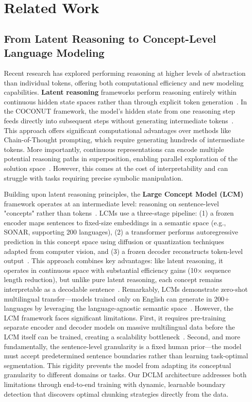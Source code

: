 \section{Related Work}
\subsection{From Latent Reasoning to Concept-Level Language Modeling}

Recent research has explored performing reasoning at higher levels of abstraction than individual tokens, offering both computational efficiency and new modeling capabilities. \textbf{Latent reasoning} frameworks perform reasoning entirely within continuous hidden state spaces rather than through explicit token generation~\cite{hao2025traininglargelanguagemodels}. In the COCONUT framework, the model's hidden state from one reasoning step feeds directly into subsequent steps without generating intermediate tokens~\cite{hao2025traininglargelanguagemodels}. This approach offers significant computational advantages over methods like Chain-of-Thought prompting, which require generating hundreds of intermediate tokens. More importantly, continuous representations can encode multiple potential reasoning paths in superposition, enabling parallel exploration of the solution space~\cite{hao2025traininglargelanguagemodels}. However, this comes at the cost of interpretability and can struggle with tasks requiring precise symbolic manipulation.

Building upon latent reasoning principles, the \textbf{Large Concept Model (LCM)} framework operates at an intermediate level: reasoning on sentence-level "concepts" rather than tokens~\cite{lcm2024large}. LCMs use a three-stage pipeline: (1) a frozen encoder maps sentences to fixed-size embeddings in a semantic space (e.g., SONAR, supporting 200 languages), (2) a transformer performs autoregressive prediction in this concept space using diffusion or quantization techniques adapted from computer vision, and (3) a frozen decoder reconstructs token-level output~\cite{lcm2024large}. This approach combines key advantages: like latent reasoning, it operates in continuous space with substantial efficiency gains (10× sequence length reduction), but unlike pure latent reasoning, each concept remains interpretable as a decodable sentence~\cite{lcm2024large}. Remarkably, LCMs demonstrate zero-shot multilingual transfer—models trained only on English can generate in 200+ languages by leveraging the language-agnostic semantic space~\cite{lcm2024large}. However, the LCM framework faces significant limitations. First, it requires pre-training separate encoder and decoder models on massive multilingual data before the LCM itself can be trained, creating a scalability bottleneck~\cite{lcm2024large}. Second, and more fundamentally, the sentence-level granularity is a fixed human prior—the model must accept predetermined sentence boundaries rather than learning task-optimal segmentation. This rigidity prevents the model from adapting its conceptual granularity to different domains or tasks. Our DCLM architecture addresses both limitations through end-to-end training with dynamic, learnable boundary detection that discovers optimal chunking strategies directly from the data.

